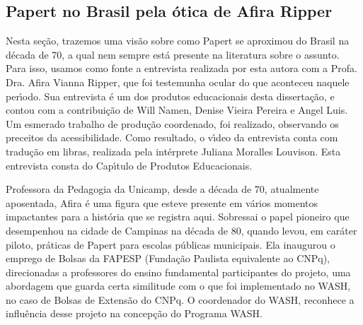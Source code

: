 \documentclass[
12pt,		%
openright,	%
twoside,  %
a4paper,			%
chapter=TITLE,		%
english,			%
french,				%
spanish,			%
brazil				%
]{USPSC-classe/USPSC}
\begin{document}
\subsection[Papert no Brasil pela \'otica de Afira Ripper]{Papert no Brasil pela \'otica de Afira Ripper}\label{Papert no Brasil pela \'otica de Afira Ripper}
Nesta se\c{c}\~ao, trazemos uma vis\~ao sobre como Papert se aproximou do Brasil na d\'ecada de 70, a qual nem sempre est\'a presente na literatura sobre o assunto. Para isso, usamos como fonte a entrevista realizada por esta autora com a Profa. Dra. Afira Vianna Ripper, que foi testemunha ocular do que aconteceu naquele per\'{\i}odo. Sua entrevista \'e um dos produtos educacionais desta disserta\c{c}\~ao, e contou com a contribui\c{c}\~ao de Will Namen, Denise Vieira Pereira e Angel Luis. Um esmerado trabalho de produ\c{c}\~ao coordenado, foi realizado, observando os preceitos da acessibilidade. Como resultado, o v\'{\i}deo da entrevista conta com tradu\c{c}\~ao em libras, realizada pela int\'erprete Juliana Moralles Louvison. Esta entrevista consta do Cap\'{\i}tulo de Produtos Educacionais.

















Professora da Pedagogia da Unicamp, desde a d\'ecada de 70, atualmente aposentada, Afira \'e uma figura que esteve presente em v\'arios momentos impactantes para a hist\'oria que se registra aqui. Sobressai o papel pioneiro que  desempenhou na cidade de Campinas na d\'ecada de 80, quando levou, em car\'ater piloto, pr\'aticas de Papert para escolas p\'ublicas municipais. Ela inaugurou o emprego de Bolsas da FAPESP (Funda\c{c}\~ao Paulista equivalente ao CNPq), direcionadas a professores do ensino fundamental participantes do projeto, uma abordagem que guarda certa similitude com o que foi implementado no WASH, no caso de Bolsas de Extens\~ao do CNPq. O coordenador do WASH, reconhece a influ\^encia desse projeto na concep\c{c}\~ao do Programa WASH.
\end{document}
